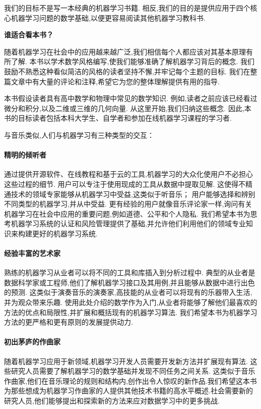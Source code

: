 我们的目标不是写一本经典的机器学习书籍. 相反,我们的目的是提供应用于四个核心机器学习问题的数学基础,以便更容易阅读其他机器学习教科书.

\begin{center}
	\textbf{谁适合看本书？}
\end{center}

随着机器学习在社会中的应用越来越广泛,我们相信每个人都应该对其基本原理有所了解. 本书以学术数学风格编写,使我们能够准确了解机器学习背后的概念. 
我们鼓励不熟悉这种看似简洁的风格的读者坚持不懈,并牢记每个主题的目标.
我们在整篇文章中有大量的评论和注释,希望它为您的整体理解提供有用的指导.

本书假设读者具有高中数学和物理中常见的数学知识. 
例如,读者之前应该已经看过微分和积分,以及二维或三维的几何向量.
从这里开始,我们归纳这些概念. 因此,本书的目标读者包括本科大学生、自学者和参加在线机器学习课程的学习者.

与音乐类似,人们与机器学习有三种类型的交互：

\paragraph{精明的倾听者} 通过提供开源软件、在线教程和基于云的工具,机器学习的大众化使用户不必担心这些过程的细节. 用户可以专注于使用现成的工具从数据中提取见解. 这使得不精通技术的领域专家能够从机器学习中受益,这类似于听音乐； 用户能够选择和辨别不同类型的机器学习,并从中受益. 更有经验的用户就像音乐评论家一样,询问有关机器学习在社会中应用的重要问题,例如道德、公平和个人隐私. 我们希望本书为思考机器学习系统的认证和风险管理提供了基础,并允许他们利用他们的领域专业知识来构建更好的机器学习系统.

\paragraph{经验丰富的艺术家} 熟练的机器学习从业者可以将不同的工具和库插入到分析过程中. 典型的从业者是数据科学家或工程师,他们了解机器学习接口及其用例,并且能够从数据中进行出色的预测. 这类似于演奏音乐的演奏家,高技能的从业者可以将现有的乐器带入生活,并为观众带来乐趣. 使用此处介绍的数学作为入门,从业者将能够了解他们最喜欢的方法的优点和局限性,并扩展和概括现有的机器学习算法. 我们希望本书为机器学习方法的更严格和更有原则的发展提供动力.

\paragraph{初出茅庐的作曲家} 随着机器学习应用于新领域,机器学习开发人员需要开发新方法并扩展现有算法. 这些研究人员需要了解机器学习的数学基础并发现不同任务之间关系. 这类似于音乐作曲家,他们在音乐理论的规则和结构内,创作出令人惊叹的新作品.我们希望这本书为那些想成为机器学习作曲家的人提供其他技术书籍的高水平概述.社会需要新的研究人员,他们能够提出和探索新的方法来应对数据学习中的更多挑战.

